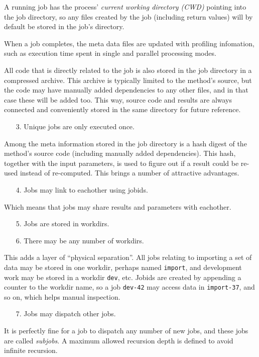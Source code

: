 A running job has the process' \textsl{current working directory
(CWD)} pointing into the job directory, so any files created by the
job (including return values) will by default be stored in the job's
directory.

When a job completes, the meta data files are updated with profiling
infomation, such as execution time spent in single and parallel
processing modes.

All code that is directly related to the job is also stored in the job
directory in a compressed archive.  This archive is typically limited
to the method's source, but the code may have manually added
dependencies to any other files, and in that case these will be added
too.  This way, source code and results are always connected and
conveniently stored in the same directory for future reference.
\begin{itemize}
\item[3.]  Unique jobs are only executed once.
\end{itemize}
Among the meta information stored in the job directory is a hash
digest of the method's source code (including manually added
dependencies).  This hash, together with the input parameters, is used
to figure out if a result could be re-used instead of re-computed.
This brings a number of attractive advantages.
\begin{itemize}
\item[4.]  Jobs may link to eachother using jobids.
\end{itemize}
Which means that jobs may share results and parameters with eachother.
\begin{itemize}
\item[5.]  Jobs are stored in workdirs.
\item[6.]  There may be any number of workdirs.
\end{itemize}
This adds a layer of ``physical separation''.  All jobs relating to
importing a set of data may be stored in one workdir, perhaps named
\texttt{import}, and development work may be stored in a workdir
\texttt{dev}, etc.  Jobids are created by appending a counter to the
workdir name, so a job \texttt{dev-42} may access data in
\texttt{import-37}, and so on, which helps manual inspection.
\begin{itemize}
\item[7.] Jobs may dispatch other jobs.
\end{itemize}
It is perfectly fine for a job to dispatch any number of new jobs, and
these jobs are called \textsl{subjobs}.  A maximum allowed recursion
depth is defined to avoid infinite recursion.



